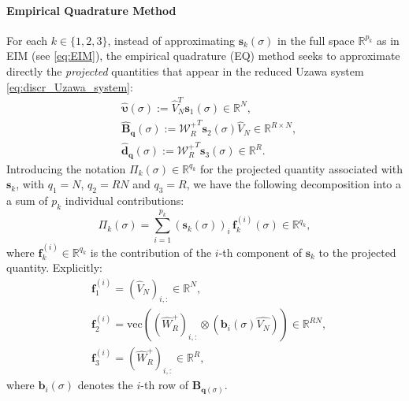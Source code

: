 \paragraph{Empirical Quadrature Method}
For each $k \in \{1,2,3\}$, instead of approximating $\mathbf{s}_k(\sigma)$ in the full space $\mathbb{R}^{p_k}$ as in EIM (see \eqref{eq:EIM}), the empirical quadrature (EQ) method seeks to approximate directly the \emph{projected} quantities that appear in the reduced Uzawa system \eqref{eq:discr_Uzawa_system}:
\begin{equation}
\begin{aligned}
  &  \hat{\boldsymbol{\upsilon}}(\sigma) := \hat{V}^{T}_N\mathbf{s}_1(\sigma) \in \mathbb{R}^N, \\
&    \hat{\mathbf{B}}_{\mathbf{q}}(\sigma) := {\mathcal{W}_{R}^{+}}^T\mathbf{s}_2(\sigma) \hat{V}_N \in \mathbb{R}^{R \times N}, \\
 &   \hat{\mathbf{d}}_{\mathbf{q}}(\sigma) := {\mathcal{W}_{R}^{+}}^T\mathbf{s}_3(\sigma) \in \mathbb{R}^R.
    \end{aligned}
    \label{eq:EQ_projected}
\end{equation}
Introducing the notation $\Pi_k(\sigma) \in \mathbb{R}^{q_k}$ for the projected quantity associated with $\mathbf{s}_k$, with $q_1 = N$, $q_2 =RN$ and $q_3 = R$, we have the following decomposition into a a sum of $p_k$ individual contributions:
\begin{equation}
    \Pi_k(\sigma) = \sum_{i=1}^{p_k} \left(\mathbf{s}_k(\sigma)\right)_i \, \mathbf{f}_k^{(i)}(\sigma) \in \mathbb{R}^{q_k},
    \label{eq:EQ_decomp}
\end{equation}
where $\mathbf{f}_k^{(i)} \in \mathbb{R}^{q_k}$ is the contribution of the $i$-th component of $\mathbf{s}_k$ to the projected quantity. Explicitly:
\begin{equation}
\begin{aligned}
   & \mathbf{f}_1^{(i)} = {(\hat{V}_N)}_{i,:} \in \mathbb{R}^N, \\
&    \mathbf{f}_2^{(i)} = \mathrm{vec}\!\left( {(\hat{W}^{+}_{R})}_{i,:}\otimes (\mathbf{b}_i(\sigma) \hat{V_N}) \right) \in \mathbb{R}^{RN}, \\
 &   \mathbf{f}_3^{(i)} = (\hat{W}^{+}_R)_{i,:} \in \mathbb{R}^R,
    \end{aligned}
\end{equation}
where $\mathbf{b}_i(\sigma)$ denotes the $i$-th row of $\mathbf{B}_{\mathbf{q}(\sigma)}$.

